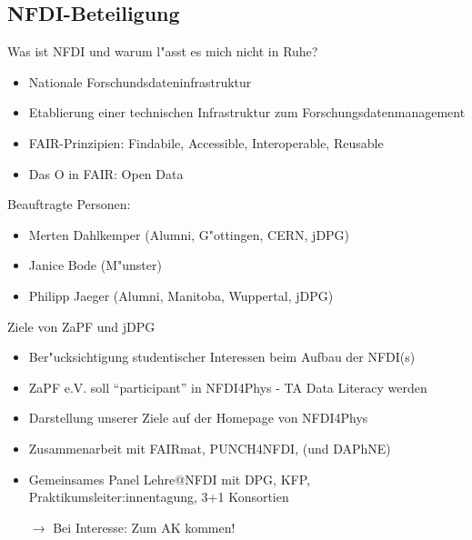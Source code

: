\documentclass[compress, aspectratio=169]{beamer}
\begin{document}
\subsection{NFDI-Beteiligung}
\begin{frame}{\insertsubsection}
	\vspace{-3mm}
	\begin{block}{Was ist NFDI und warum l"asst es mich nicht in Ruhe?}
		\begin{itemize}
			\item Nationale Forschundsdateninfrastruktur
			\item Etablierung einer technischen Infrastruktur zum Forschungsdatenmanagement
			\item FAIR-Prinzipien: Findabile, Accessible, Interoperable, Reusable
			\item \glqq Das O in FAIR\grqq: Open Data
		\end{itemize}
	\end{block}
	\pause
	\vspace{4mm}
	\scriptsize
	Beauftragte Personen:
	\begin{itemize}
		\item Merten Dahlkemper (Alumni, G"ottingen, CERN, jDPG)
		\item Janice Bode (M"unster)
		\item Philipp Jaeger (Alumni, Manitoba, Wuppertal, jDPG)
	\end{itemize}
\end{frame}
\begin{frame}{\insertsubsection}
	Ziele von ZaPF und jDPG
	\begin{itemize}
		\item Ber"ucksichtigung studentischer Interessen beim Aufbau der NFDI(s)
 		\item ZaPF e.V. soll ``participant'' in NFDI4Phys - TA Data Literacy werden
 		\item Darstellung unserer Ziele auf der Homepage von NFDI4Phys
 		\item Zusammenarbeit mit FAIRmat, PUNCH4NFDI, (und DAPhNE) 
 		\item Gemeinsames Panel Lehre@NFDI mit DPG, KFP, Praktikumsleiter:innentagung, 3+1 Konsortien
 		\vspace{4mm}\item[$\rightarrow$] Bei Interesse: Zum AK kommen!
 	\end{itemize}
 \end{frame}
\end{document}
